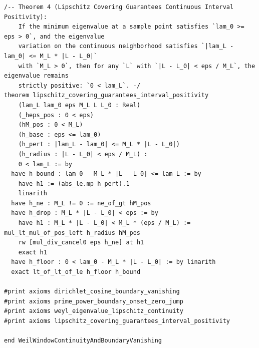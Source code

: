 \documentclass[11pt,a4paper]{article}
\begin{document}
\begin{lstlisting}[language=Lean4]
/-- Theorem 4 (Lipschitz Covering Guarantees Continuous Interval Positivity):
    If the minimum eigenvalue at a sample point satisfies `lam_0 >= eps > 0`, and the eigenvalue
    variation on the continuous neighborhood satisfies `|lam_L - lam_0| <= M_L * |L - L_0|`
    with `M_L > 0`, then for any `L` with `|L - L_0| < eps / M_L`, the eigenvalue remains
    strictly positive: `0 < lam_L`. -/
theorem lipschitz_covering_guarantees_interval_positivity
    (lam_L lam_0 eps M_L L L_0 : Real)
    (_heps_pos : 0 < eps)
    (hM_pos : 0 < M_L)
    (h_base : eps <= lam_0)
    (h_pert : |lam_L - lam_0| <= M_L * |L - L_0|)
    (h_radius : |L - L_0| < eps / M_L) :
    0 < lam_L := by
  have h_bound : lam_0 - M_L * |L - L_0| <= lam_L := by
    have h1 := (abs_le.mp h_pert).1
    linarith
  have h_ne : M_L != 0 := ne_of_gt hM_pos
  have h_drop : M_L * |L - L_0| < eps := by
    have h1 : M_L * |L - L_0| < M_L * (eps / M_L) := mul_lt_mul_of_pos_left h_radius hM_pos
    rw [mul_div_cancel0 eps h_ne] at h1
    exact h1
  have h_floor : 0 < lam_0 - M_L * |L - L_0| := by linarith
  exact lt_of_lt_of_le h_floor h_bound

#print axioms dirichlet_cosine_boundary_vanishing
#print axioms prime_power_boundary_onset_zero_jump
#print axioms weyl_eigenvalue_lipschitz_continuity
#print axioms lipschitz_covering_guarantees_interval_positivity

end WeilWindowContinuityAndBoundaryVanishing
\end{lstlisting}
\end{document}
